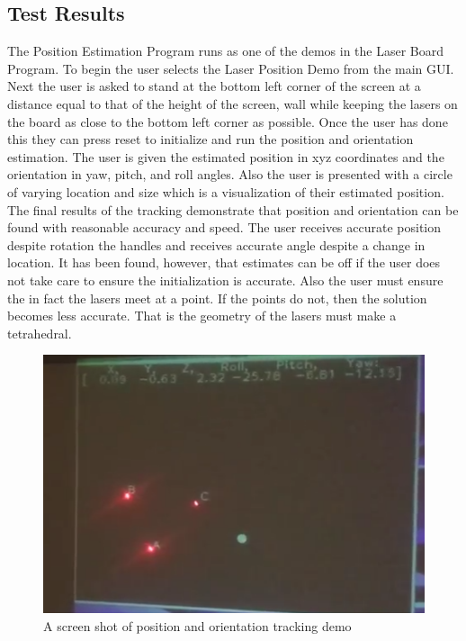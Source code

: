 \documentclass[a4paper]{article}
\begin{document}
\subsection{Test Results}
The Position Estimation Program runs as one of the demos in the Laser Board Program. To begin the user selects the Laser Position Demo from the main GUI. Next the user is asked to stand at the bottom left corner of the screen at a distance equal to that of the height of the screen, wall while keeping the lasers on the board as close to the bottom left corner as possible. Once the user has done this they can press reset to initialize and run the position and orientation estimation. 
The user is given the estimated position in xyz coordinates and the orientation in yaw, pitch, and roll angles. Also the user is presented with a circle of varying location and size which is a visualization of their estimated position. 
The final results of the tracking demonstrate that position and orientation can be found with reasonable accuracy and speed. The user receives accurate position despite rotation the handles and receives accurate angle despite a change in location.  It has been found, however, that estimates can be off if the user does not take care to ensure the initialization is accurate. Also the user must ensure the in fact the lasers meet at a point. If the points do not, then the solution becomes less accurate. That is the geometry of the lasers must make a tetrahedral. 

\begin{figure}
	\includegraphics[width = \linewidth]{pot.png}
	\caption{A screen shot of position and orientation tracking demo \cite{techDemos}}
\end{figure}
\end{document}
